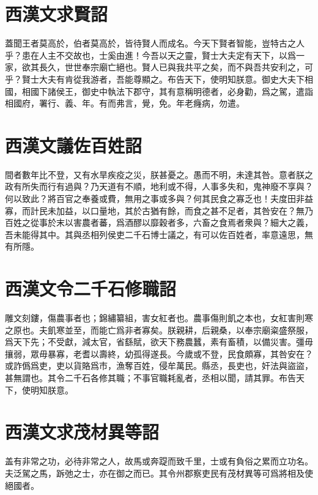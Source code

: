 \section[高帝求賢詔\quad{\small 西漢文}]{{\normalsize 西漢文}\quad {}求賢詔}
蓋聞王者莫高於，伯者莫高於，皆待賢人而成名。今天下賢者智能，豈特古之人乎？患在人主不交故也，士奚由進！今吾以天之靈，賢士大夫定有天下，以爲一家，欲其長久，世世奉宗廟亡絕也。賢人已與我共平之矣，而不與吾共安利之，可乎？賢士大夫有肯從我游者，吾能尊顯之。布告天下，使明知朕意。御史大夫下相國，相國下諸侯王，御史中執法下郡守，其有意稱明德者，必身勸，爲之駕，遣詣相國府，署行、義、年。有而弗言，覺，免。年老癃病，勿遣。 

\section[文帝議佐百姓詔\quad{\small 西漢文}]{{\normalsize 西漢文}\quad {}議佐百姓詔}
間者數年比不登，又有水旱疾疫之災，朕甚憂之。愚而不明，未達其咎。意者朕之政有所失而行有過與？乃天道有不順，地利或不得，人事多失和，鬼神廢不享與？何以致此？將百官之奉養或費，無用之事或多與？何其民食之寡乏也！夫度田非益寡，而計民未加益，以口量地，其於古猶有餘，而食之甚不足者，其咎安在？無乃百姓之從事於末以害農者蕃，爲酒醪以靡穀者多，六畜之食焉者衆與？細大之義，吾未能得其中。其與丞相列侯吏二千石博士議之，有可以佐百姓者，率意遠思，無有所隱。

\section[景帝令二千石修職詔\quad{\small 西漢文}]{{\normalsize 西漢文}\quad {}令二千石修職詔}
雕文刻鏤，傷農事者也；錦繡纂組，害女紅者也。農事傷則飢之本也，女紅害則寒之原也。夫飢寒並至，而能亡爲非者寡矣。朕親耕，后親桑，以奉宗廟粢盛祭服，爲天下先；不受獻，減太官，省繇賦，欲天下務農蠶，素有畜積，以備災害。彊毋攘弱，眾毋暴寡，老耆以壽終，幼孤得遂長。今歲或不登，民食頗寡，其咎安在？或詐僞爲吏，吏以貨賂爲市，漁奪百姓，侵牟萬民。縣丞，長吏也，奸法與盜盜，甚無謂也。其令二千石各修其職；不事官職耗亂者，丞相以聞，請其罪。布告天下，使明知朕意。

\theendnotes

\section[武帝求茂材異等詔\quad{\small 西漢文}]{{\normalsize 西漢文}\quad {}求茂材異等詔}
盖有非常之功，必待非常之人，故馬或奔踶而致千里，士或有負俗之累而立功名。夫泛駕之馬，跅弛之士，亦在御之而已。其令州郡察吏民有茂材異等可爲將相及使絕國者。 

